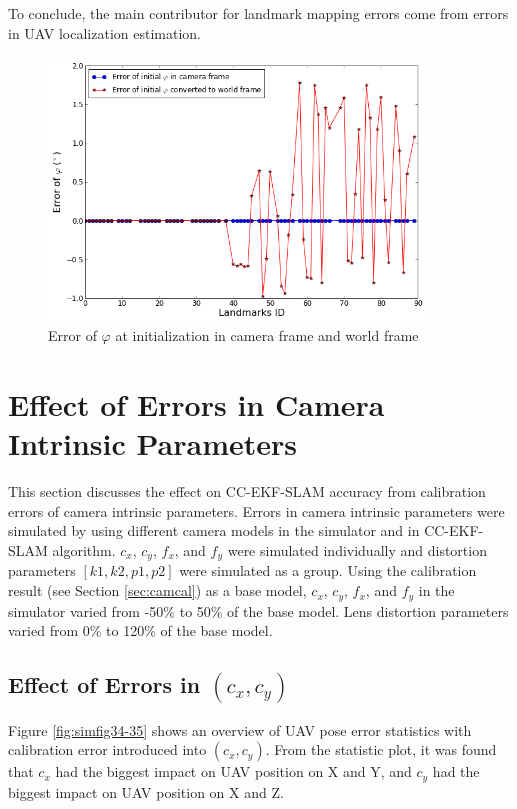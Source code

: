 To conclude, the main contributor for landmark mapping errors come
from errors in UAV localization estimation.

\begin{figure}[h] %
  \centering
  \includegraphics[width=10cm, height=7cm]{./Figures/SimulationFigures/Figure26.png}
  \caption{Error of $\varphi$ at initialization in camera frame and
    world frame}
  \label{fig:simfig26}
\end{figure}
\FloatBarrier

\section{Effect of Errors in Camera Intrinsic Parameters}
This section discusses the effect on CC-EKF-SLAM accuracy from
calibration errors of camera intrinsic parameters. Errors in camera
intrinsic parameters were simulated by using different 
camera models in the simulator and in CC-EKF-SLAM algorithm.
$c_{x}$, $c_{y}$, $f_{x}$, and $f_{y}$ were simulated individually and
distortion parameters $[k1, k2, p1, p2]$ were simulated as a group.
Using the calibration result (see Section \ref{sec:camcal}) as a
base model, $c_{x}$, $c_{y}$, $f_{x}$, and $f_{y}$ in the simulator
varied from -50\% to 50\% of the base model. Lens distortion
parameters varied from 0\% to 120\% of the base model.

\subsection{Effect of Errors in $(c_{x}, c_{y})$}
Figure \ref{fig:simfig34-35} shows an overview of UAV pose error
statistics with calibration error introduced into $(c_{x}, c_{y})$. From
the statistic plot, it was found that $c_x$ had the biggest impact on UAV
position on X and Y, and $c_y$ had the biggest impact on UAV position on X
and Z.

